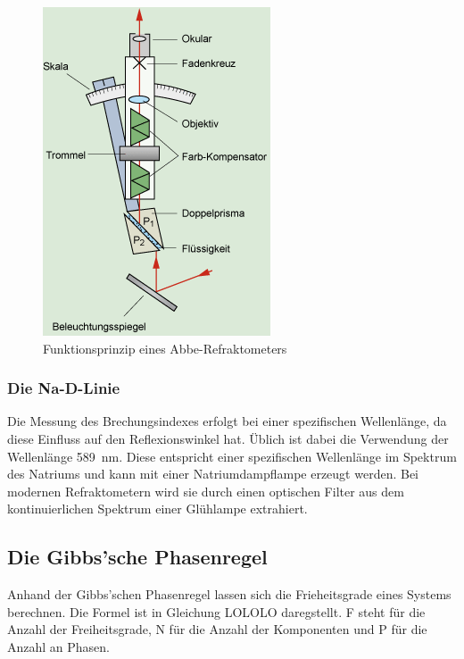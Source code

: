 \begin{figure}[h!]
	\centering
	\includegraphics[width=0.7\linewidth]{img/refraktometer}
	\caption{Funktionsprinzip eines Abbe-Refraktometers \cite{refraktometer}}
	\label{fig:refraktometer}
\end{figure}

\subsubsection*{Die Na-D-Linie}

Die Messung des Brechungsindexes erfolgt bei einer spezifischen Wellenlänge, da diese Einfluss auf den Reflexionswinkel hat. Üblich ist dabei die Verwendung der  Wellenlänge  \SI{589}{\nano\meter}. Diese entspricht einer spezifischen Wellenlänge im Spektrum des Natriums und kann mit einer Natriumdampflampe erzeugt werden. Bei modernen Refraktometern wird sie durch einen optischen Filter aus dem kontinuierlichen Spektrum einer Glühlampe extrahiert.
\FloatBarrier
\subsection{Die Gibbs'sche Phasenregel}
Anhand der Gibbs'schen Phasenregel lassen sich die Frieheitsgrade eines Systems berechnen. Die Formel ist in Gleichung LOLOLO daregstellt. F steht für die Anzahl der Freiheitsgrade, N für die Anzahl der Komponenten und P für die Anzahl an Phasen.

